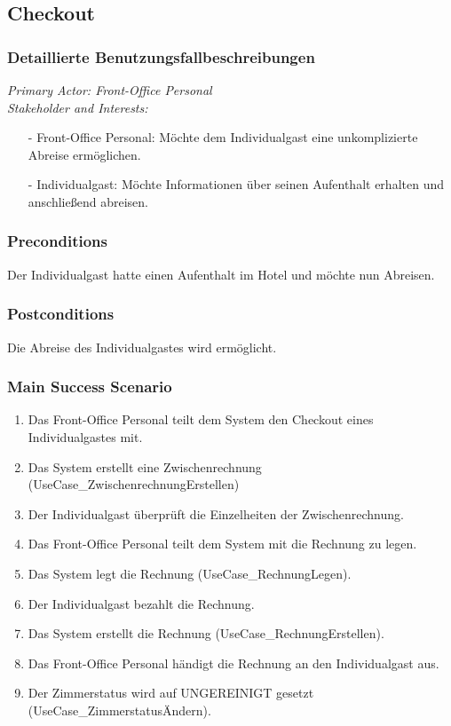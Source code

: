 \documentclass[./detailed_overview_usecases.tex]{subfiles}
\begin{document}
    \subsection{Checkout}
    \subsubsection{Detaillierte Benutzungsfallbeschreibungen}
    \textit{Primary Actor: Front-Office Personal}
    \\
    \textit{Stakeholder and Interests:}
    \begin{itemize}
        \item[-] Front-Office Personal: Möchte dem Individualgast eine unkomplizierte Abreise ermöglichen.
        \item[-] Individualgast: Möchte Informationen über seinen Aufenthalt erhalten und anschließend abreisen.
    \end{itemize}

    \subsubsection*{Preconditions}
    Der Individualgast hatte einen Aufenthalt im Hotel und möchte nun Abreisen.

    \subsubsection*{Postconditions}
    Die Abreise des Individualgastes wird ermöglicht.

    \subsubsection*{Main Success Scenario}
    \begin{enumerate}
        \item Das Front-Office Personal teilt dem System den Checkout eines Individualgastes mit.
        \item Das System erstellt eine Zwischenrechnung (UseCase_ZwischenrechnungErstellen)
        \item Der Individualgast überprüft die Einzelheiten der Zwischenrechnung.
        \item Das Front-Office Personal teilt dem System mit die Rechnung zu legen.
        \item Das System legt die Rechnung (UseCase_RechnungLegen).
        \item Der Individualgast bezahlt die Rechnung.
        \item Das System erstellt die Rechnung (UseCase_RechnungErstellen).
        \item Das Front-Office Personal händigt die Rechnung an den Individualgast aus.
        \item Der Zimmerstatus wird auf UNGEREINIGT gesetzt (UseCase_ZimmerstatusÄndern).
    \end{enumerate}
\end{document}
